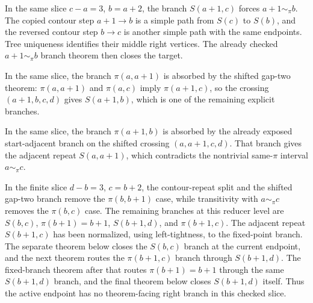 \begin{theorem}
  \label{thm:left-gap-three-S-a1-c}
  \leanok
  In the same slice \(c-a=3\), \(b=a+2\), the branch \(S(a+1,c)\) forces
  \(a+1\sim_\pi b\).  The copied contour step \(a+1\to b\) is a simple path
  from \(S(c)\) to \(S(b)\), and the reversed contour step \(b\to c\) is
  another simple path with the same endpoints.  Tree uniqueness identifies
  their middle right vertices.  The already checked
  \(a+1\sim_\pi b\) branch theorem then closes the target.
\end{theorem}

\begin{theorem}
  \label{thm:left-gap-three-pi-a-a1}
  \leanok
  In the same slice, the branch \(\pi(a,a+1)\) is absorbed by the shifted
  gap-two theorem: \(\pi(a,a+1)\) and \(\pi(a,c)\) imply
  \(\pi(a+1,c)\), so the crossing \((a+1,b,c,d)\) gives \(S(a+1,b)\), which
  is one of the remaining explicit branches.
\end{theorem}

\begin{theorem}
  \label{thm:left-gap-three-pi-a1-b}
  \leanok
  In the same slice, the branch \(\pi(a+1,b)\) is absorbed by the already
  exposed start-adjacent branch on the shifted crossing \((a,a+1,c,d)\).
  That branch gives the adjacent repeat \(S(a,a+1)\), which contradicts the
  nontrivial same-\(\pi\) interval \(a\sim_\pi c\).
\end{theorem}

\begin{theorem}
  \label{thm:right-gap-three-reduction}
  \leanok
  In the finite slice \(d-b=3\), \(c=b+2\), the contour-repeat split and the
  shifted gap-two branch remove the \(\pi(b,b+1)\) case, while transitivity
  with \(a\sim_\pi c\) removes the \(\pi(b,c)\) case.  The remaining branches
  at this reducer level are \(S(b,c)\), \(\pi(b+1)=b+1\), \(S(b+1,d)\), and
  \(\pi(b+1,c)\).  The adjacent repeat \(S(b+1,c)\) has been normalized,
  using left-tightness, to the fixed-point branch.  The separate theorem below
  closes the \(S(b,c)\) branch at the current endpoint, and the next theorem
  routes the \(\pi(b+1,c)\) branch through \(S(b+1,d)\).  The fixed-branch
  theorem after that routes \(\pi(b+1)=b+1\) through the same \(S(b+1,d)\)
  branch, and the final theorem below closes \(S(b+1,d)\) itself.  Thus the
  active endpoint has no theorem-facing right branch in this checked slice.
\end{theorem}

